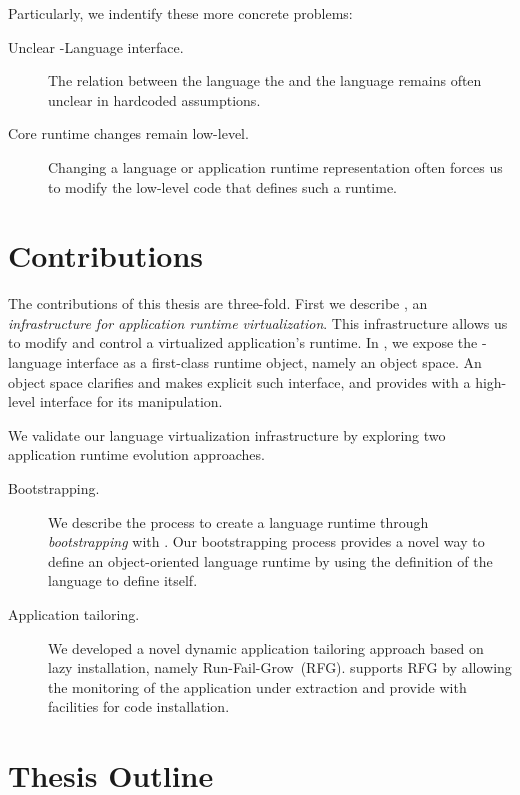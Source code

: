 Particularly, we indentify these more concrete problems:
\begin{description}
\item[Unclear \VM-Language interface.] The relation between the language the \VM and the language remains often unclear in \VM hardcoded assumptions.
\item[Core runtime changes remain low-level.] Changing a language or application runtime representation often forces us to modify the low-level code that defines such a runtime.
\end{description}


\section{Contributions}

The contributions of this thesis are three-fold. First we describe \Vtt, an \emph{infrastructure for application runtime virtualization}. This infrastructure allows us to modify and control a virtualized application's runtime. In \Vtt, we expose the \VM-language interface as a first-class runtime object, namely an object space. An object space clarifies and makes explicit such interface, and provides with a high-level interface for its manipulation.

We validate our language virtualization infrastructure by exploring two application runtime evolution approaches.
\begin{description}
\item[Bootstrapping.] We describe the process to create a language runtime through \emph{bootstrapping} with \Vtt. Our bootstrapping process provides a novel way to define an object-oriented language runtime by using the definition of the language to define itself.
\item[Application tailoring.] We developed a novel dynamic application tailoring approach based on lazy installation, namely Run-Fail-Grow~(RFG). \Vtt supports RFG by allowing the monitoring of the application under extraction and provide with facilities for code installation.
\end{description}

\section{Thesis Outline}

